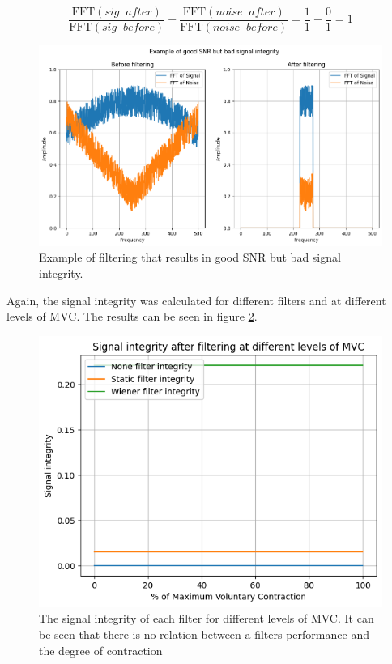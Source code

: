 \begin{equation}
    \frac{\text{FFT}(sig \;\; after)}{\text{FFT}(sig \;\;  before)} - \frac{\text{FFT}(noise \;\;  after)}{\text{FFT}(noise \;\;  before)} = \frac{1}{1} - \frac{0}{1} = 1
    \label{eq:signal_integrity}
\end{equation}

\begin{figure}[h!t]
	\begin{center}
		\includegraphics[width=1.0\columnwidth]{images/good_snr_bad_integrity.png}
	\end{center}
	\caption{Example of filtering that results in good SNR but bad signal integrity.}
	\label{fig:good_snr_bad_integrity}
\end{figure}

Again, the signal integrity was calculated for different filters and at different levels of MVC. The results can be seen in figure \ref{fig:filter_signal_integrity_mvc}.

\begin{figure}[h!t]
	\begin{center}
		\includegraphics[width=1.0\columnwidth]{images/filter_signal_integrity_mvc.png}
	\end{center}
	\caption{The signal integrity of each filter for different levels of MVC. It can be seen that there is no relation between a filters performance and the degree of contraction}
	\label{fig:filter_signal_integrity_mvc}
\end{figure}

